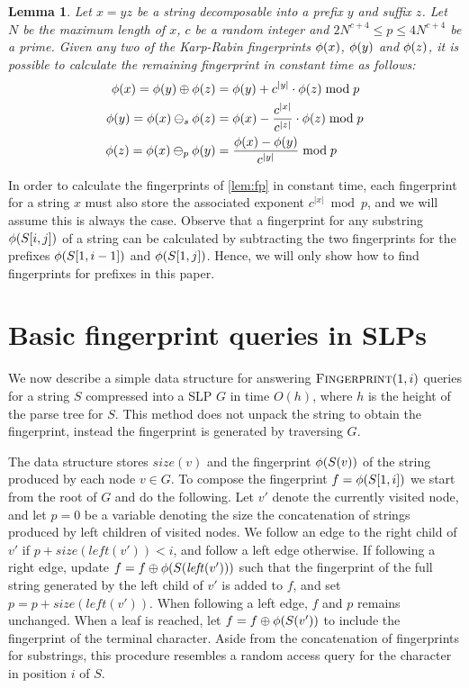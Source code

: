 \documentclass[11pt]{article}
\newtheorem{lemma}{Lemma}
\newcommand{\fingerprintq}{\ensuremath{\textsc{Fingerprint}}}
\newcommand{\fp}{\ensuremath\phi}
\newcommand{\fpplus}{\ensuremath{\oplus}}
\newcommand{\fpdelsuffix}{\ensuremath{\ominus_s}}
\newcommand{\fpdelprefix}{\ensuremath{\ominus_p}}
\newcommand{\size}{\ensuremath{\mathit{size}}}
\newcommand{\lchild}{\ensuremath{\mathit{left}}}
\newcommand{\slp}{\ensuremath{G} }
\begin{document}
\begin{lemma}\label{lem:fp}
Let $x = y z$ be a string decomposable into a prefix $y$ and suffix $z$. Let $N$ be the maximum length of $x$, $c$ be a random integer and $2N^{c+4} \leq p \leq 4N^{c+4}$ be a prime. Given any two of the Karp-Rabin fingerprints $\fp(x)$, $\fp(y)$ and $\fp(z)$, it is possible to calculate the remaining fingerprint in constant time as follows:
\begin{align*}
	\fp(x) = \fp(y) \fpplus \fp(z) &= \fp(y) + c^{|y|} \cdot \fp(z) \bmod p \\
	\fp(y) = \fp(x) \fpdelsuffix \fp(z) &= \fp(x) - \frac{c^{|x|}}{c^{|z|}} \cdot \fp(z) \bmod p \\
	\fp(z) = \fp(x) \fpdelprefix \fp(y) &= \frac{\fp(x) - \fp(y)}{c^{|y|}} \bmod p
\end{align*}
\end{lemma}

\noindent In order to calculate the fingerprints of \autoref{lem:fp} in constant time, each fingerprint for a string $x$ must also store the associated exponent $c^{|x|} \bmod p$, and we will assume this is always the case. Observe that a fingerprint for any substring $\fp(S[i, j])$ of a string can be calculated by subtracting the two fingerprints for the prefixes $\fp(S[1, i-1])$ and $\fp(S[1, j])$. Hence, we will only show how to find fingerprints for prefixes in this paper.

\section{Basic fingerprint queries in SLPs}
We now describe a simple data structure for answering $\fingerprintq(1, i)$ queries for a string $S$ compressed into a SLP $\slp$ in time $O(h)$, where $h$ is the height of the parse tree for $S$. This method does not unpack the string to obtain the fingerprint, instead the fingerprint is generated by traversing $\slp$. 



The data structure stores $\size(v)$ and the fingerprint $\fp(S(v))$ of the string produced by each node $v \in \slp$. To compose the fingerprint $f = \fp(S[1, i])$ we start from the root of \slp and do the following. Let $v'$ denote the currently visited node, and let $p=0$ be a variable denoting the size the concatenation of strings produced by left children of visited nodes. We follow an edge to the right child of $v'$ if $p+\size(\lchild(v')) < i$, and follow a left edge otherwise. If following a right edge, update $f = f \fpplus \fp(S(\lchild(v')))$ such that the fingerprint of the full string generated by the left child of $v'$ is added to $f$, and set $p = p+\size(\lchild(v'))$. When following a left edge, $f$ and $p$ remains unchanged. When a leaf is reached, let $f = f \fpplus \fp(S(v'))$ to include the fingerprint of the terminal character. Aside from the concatenation of fingerprints for substrings, this procedure resembles a random access query for the character in position $i$ of $S$.
\end{document}
